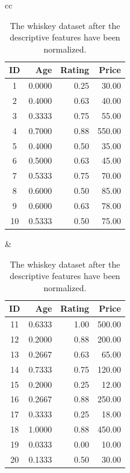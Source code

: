 \documentclass[xcolor={table}]{beamer}
\begin{document}
 \begin{frame} 
\begin{table}[htb]
\caption{The whiskey dataset after the descriptive features have been normalized.}
\label{table:whiskeyPriceModelNorm}
\begin{center}
\begin{footnotesize}
\begin{tabular}{cc}
		\hline
			\begin{minipage}{0.45\textwidth}
					\begin{tabular}[ht]{crrr} 
\textbf{ID}	 & \textbf{Age} & \textbf{Rating} & \textbf{Price}\\
\hline
1	&0.0000	&0.25	&30.00\\
2	&0.4000	&0.63	&40.00\\
3	&0.3333	&0.75	&55.00\\
4	&0.7000	&0.88	&550.00\\
5	&0.4000	&0.50	&35.00\\
6	&0.5000	&0.63	&45.00\\
7	&0.5333	&0.75	&70.00\\
8	&0.6000	&0.50	&85.00\\
9	&0.6000	&0.63	&78.00\\
10	&0.5333	&0.50	&75.00\\
\hline
					\end{tabular}
			\end{minipage}
			&
			\begin{minipage}{0.45\textwidth}
					\begin{tabular}[ht]{crrr} 
\textbf{ID}	 & \textbf{Age} & \textbf{Rating} & \textbf{Price}\\
\hline
11	&0.6333	&1.00	&500.00\\
12	&0.2000	&0.88	&200.00\\
13	&0.2667	&0.63	&65.00\\
14	&0.7333	&0.75	&120.00\\
15	&0.2000	&0.25	&12.00\\
16	&0.2667	&0.88	&250.00\\
17	&0.3333	&0.25	&18.00\\
18	&1.0000	&0.88	&450.00\\
19	&0.0333	&0.00	&10.00\\
20	&0.1333	&0.50	&30.00\\
\hline
				\end{tabular}
			\end{minipage}\\
\end{tabular}
\end{footnotesize}
\end{center}
\end{table}
\end{frame} 
\end{document}
